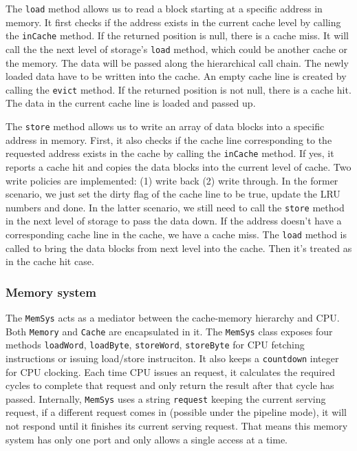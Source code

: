 \documentclass{sig-alternate}
\begin{document}
The \texttt{load} method allows us to read a block starting at a specific address in memory. It first checks if the address exists in the current cache level by calling the \texttt{inCache} method. If the returned position is null, there is a cache miss. It will call the the next level of storage's \texttt{load} method, which could be another cache or the memory. The data will be passed along the hierarchical call chain. The newly loaded data have to be written into the cache. An empty cache line is created by calling the \texttt{evict} method. If the returned position is not null, there is a cache hit. The data in the current cache line is loaded and passed up. 

The \texttt{store} method allows us to write an array of data blocks into a specific address in memory. First, it also checks if the cache line corresponding to the requested address exists in the cache by calling the \texttt{inCache} method. If yes, it reports a cache hit and copies the data blocks into the current level of cache. Two write policies are implemented: (1) write back (2) write through. In the former scenario, we just set the dirty flag of the cache line to be true, update the LRU numbers and done. In the latter scenario, we still need to call the \texttt{store} method in the next level of storage to pass the data down. If the address doesn't have a corresponding cache line in the cache, we have a cache miss. The \texttt{load} method is called to bring the data blocks from next level into the cache. Then it's treated as in the cache hit case. 
 
\subsubsection{Memory system}
The \texttt{MemSys} acts as a mediator between the cache-memory hierarchy and CPU. Both \texttt{Memory} and \texttt{Cache} are encapsulated in it. The \texttt{MemSys} class exposes four methods \texttt{loadWord}, \texttt{loadByte}, \texttt{storeWord}, \texttt{storeByte} for CPU fetching instructions or issuing load/store instruciton. It also keeps a \texttt{countdown} integer for CPU clocking. Each time CPU issues an request, it calculates the required cycles to complete that request and only return the result after that cycle has passed. Internally, \texttt{MemSys} uses a string \texttt{request} keeping the current serving request, if a different request comes in (possible under the pipeline mode), it will not respond until it finishes its current serving request. That means this memory system has only one port and only allows a single access at a time. 
\end{document}
